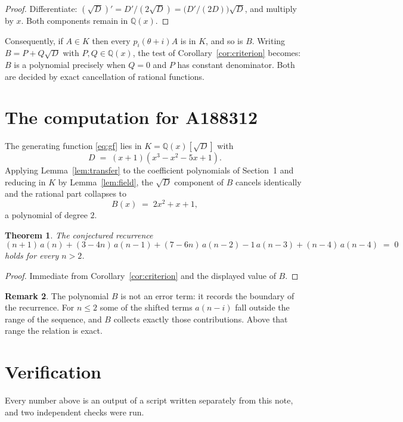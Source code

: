 \documentclass[11pt,a4paper]{article}
\theoremstyle{plain}
\newtheorem{theorem}{Theorem}
\theoremstyle{definition}
\newtheorem{remark}[theorem]{Remark}
\begin{document}
\begin{proof}
Differentiate: $(\sqrt{D})'=D'/(2\sqrt{D})=\bigl(D'/(2D)\bigr)\sqrt{D}$, and multiply by
$x$. Both components remain in $\mathbb{Q}(x)$.
\end{proof}

Consequently, if $A\in K$ then every $p_{i}(\theta+i)A$ is in $K$, and so is $B$. Writing
$B=P+Q\sqrt{D}$ with $P,Q\in\mathbb{Q}(x)$, the test of Corollary~\ref{cor:criterion}
becomes: $B$ is a polynomial precisely when $Q=0$ and $P$ has constant denominator. Both
are decided by exact cancellation of rational functions.

\section{The computation for A188312}

The generating function \eqref{eq:gf} lies in $K=\mathbb{Q}(x)[\sqrt{D}]$ with
\[
D \;=\; \left(x + 1\right) \left(x^{3} - x^{2} - 5 x + 1\right) .
\]
Applying Lemma~\ref{lem:transfer} to the coefficient polynomials of Section~1 and reducing
in $K$ by Lemma~\ref{lem:field}, the $\sqrt{D}$ component of $B$ cancels identically and
the rational part collapses to
\[
B(x)\;=\;2 x^{2} + x + 1 ,
\]
a polynomial of degree $2$.

\begin{theorem}
The conjectured recurrence
\[
(n + 1)\,a(n) + (3 - 4 n)\,a(n-1) + (7 - 6 n)\,a(n-2) - 1\,a(n-3) + (n - 4)\,a(n-4) \;=\;0
\]
holds for every $n>2$.
\end{theorem}

\begin{proof}
Immediate from Corollary~\ref{cor:criterion} and the displayed value of $B$.
\end{proof}

\begin{remark}
The polynomial $B$ is not an error term: it records the boundary of the recurrence. For
$n\le2$ some of the shifted terms $a(n-i)$ fall outside the range of the sequence,
and $B$ collects exactly those contributions. Above that range the relation is exact.
\end{remark}

\section{Verification}

Every number above is an output of a script written separately from this note, and two
independent checks were run.
\end{document}
